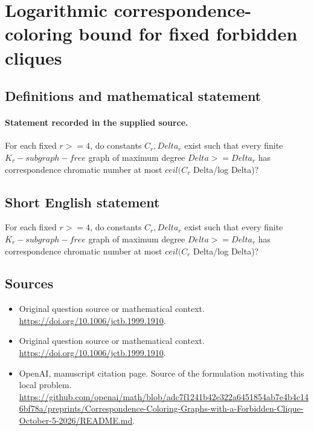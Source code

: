 \documentclass[11pt]{article}
\begin{document}
\section*{Logarithmic correspondence-coloring bound for fixed forbidden cliques}\label{30007083}
\subsection{Definitions and mathematical statement}
\paragraph{Statement recorded in the supplied source.}
For each fixed $r>=4$, do constants $C_r,Delta_r$ exist such that every finite $K_r-subgraph-free$ graph of maximum degree $Delta>=Delta_r$ has correspondence chromatic number at most $ceil(C_r$ Delta/log Delta)?
\subsection{Short English statement}
For each fixed $r>=4$, do constants $C_r,Delta_r$ exist such that every finite $K_r-subgraph-free$ graph of maximum degree $Delta>=Delta_r$ has correspondence chromatic number at most $ceil(C_r$ Delta/log Delta)?
\subsection{Sources}
\begin{itemize}
\item[S1] Original question source or mathematical context.
\url{https://doi.org/10.1006/jctb.1999.1910}.
\item[S2] Original question source or mathematical context.
\url{https://doi.org/10.1006/jctb.1999.1910}.
\item[S3] OpenAI, manuscript citation page. Source of the formulation motivating this local problem.
\url{https://github.com/openai/math/blob/adc7f1241b42e322a6451854ab7e4b4c146bf78a/preprints/Correspondence-Coloring-Graphs-with-a-Forbidden-Clique-October-5-2026/README.md}.
\end{itemize}
\end{document}
